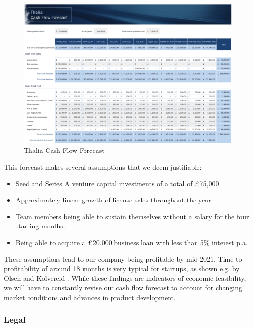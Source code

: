 \documentclass[main.tex]{subfiles}
\begin{document}
\begin{figure}[H]
    \caption{Thalia Cash Flow Forecast}
	\includegraphics[width=\textwidth]{03Requirements/03Pictures/cash_flow_forecast.png}
\end{figure}

This forecast makes several assumptions that we deem justifiable:

\begin{itemize}
    \item Seed and Series A venture capital investments of a total of £75,000.
    \item Approximately linear growth of license sales throughout the year.
    \item Team members being able to sustain themselves without a salary for the four starting months.
    \item Being able to acquire a £20.000 business loan with less than 5\% interest p.a.
\end{itemize}

These assumptions lead to our company being profitable by mid 2021. Time to profitability of around 18 months is very typical for startups, as shown e.g. by Olsen and Kolvereid \cite{startup_profitability}. While these findings are indicators of economic feasibility, we will have to constantly revise our cash flow forecast to account for changing market conditions and advances in product development.

\subsubsection{Legal}
\end{document}
